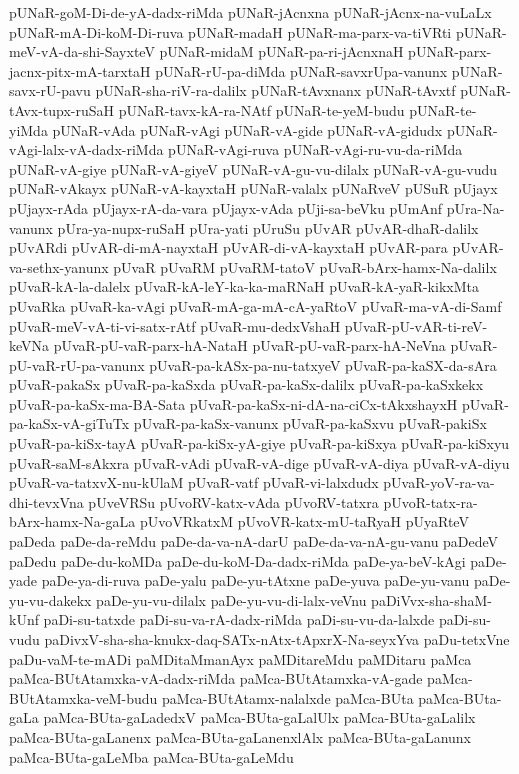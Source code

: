 {pUNaR-goM-Di-de-yA-dadx-riMda
pUNaR-jAcnxna
pUNaR-jAcnx-na-vuLaLx
pUNaR-mA-Di-koM-Di-ruva
pUNaR-madaH
pUNaR-ma-parx-va-tiVRti
pUNaR-meV-vA-da-shi-SayxteV
pUNaR-midaM
pUNaR-pa-ri-jAcnxnaH
pUNaR-parx-jacnx-pitx-mA-tarxtaH
pUNaR-rU-pa-diMda
pUNaR-savxrUpa-vanunx
pUNaR-savx-rU-pavu
pUNaR-sha-riV-ra-dalilx
pUNaR-tAvxnanx
pUNaR-tAvxtf
pUNaR-tAvx-tupx-ruSaH
pUNaR-tavx-kA-ra-NAtf
pUNaR-te-yeM-budu
pUNaR-te-yiMda
pUNaR-vAda
pUNaR-vAgi
pUNaR-vA-gide
pUNaR-vA-gidudx
pUNaR-vAgi-lalx-vA-dadx-riMda
pUNaR-vAgi-ruva
pUNaR-vAgi-ru-vu-da-riMda
pUNaR-vA-giye
pUNaR-vA-giyeV
pUNaR-vA-gu-vu-dilalx
pUNaR-vA-gu-vudu
pUNaR-vAkayx
pUNaR-vA-kayxtaH
pUNaR-valalx
pUNaRveV
pUSuR
pUjayx
pUjayx-rAda
pUjayx-rA-da-vara
pUjayx-vAda
pUji-sa-beVku
pUmAnf
pUra-Na-vanunx
pUra-ya-nupx-ruSaH
pUra-yati
pUruSu
pUvAR
pUvAR-dhaR-dalilx
pUvARdi
pUvAR-di-mA-nayxtaH
pUvAR-di-vA-kayxtaH
pUvAR-para
pUvAR-va-sethx-yanunx
pUvaR
pUvaRM
pUvaRM-tatoV
pUvaR-bArx-hamx-Na-dalilx
pUvaR-kA-la-dalelx
pUvaR-kA-leY-ka-ka-maRNaH
pUvaR-kA-yaR-kikxMta
pUvaRka
pUvaR-ka-vAgi
pUvaR-mA-ga-mA-cA-yaRtoV
pUvaR-ma-vA-di-Samf
pUvaR-meV-vA-ti-vi-satx-rAtf
pUvaR-mu-dedxVshaH
pUvaR-pU-vAR-ti-reV-keVNa
pUvaR-pU-vaR-parx-hA-NataH
pUvaR-pU-vaR-parx-hA-NeVna
pUvaR-pU-vaR-rU-pa-vanunx
pUvaR-pa-kASx-pa-nu-tatxyeV
pUvaR-pa-kaSX-da-sAra
pUvaR-pakaSx
pUvaR-pa-kaSxda
pUvaR-pa-kaSx-dalilx
pUvaR-pa-kaSxkekx
pUvaR-pa-kaSx-ma-BA-Sata
pUvaR-pa-kaSx-ni-dA-na-ciCx-tAkxshayxH
pUvaR-pa-kaSx-vA-giTuTx
pUvaR-pa-kaSx-vanunx
pUvaR-pa-kaSxvu
pUvaR-pakiSx
pUvaR-pa-kiSx-tayA
pUvaR-pa-kiSx-yA-giye
pUvaR-pa-kiSxya
pUvaR-pa-kiSxyu
pUvaR-saM-sAkxra
pUvaR-vAdi
pUvaR-vA-dige
pUvaR-vA-diya
pUvaR-vA-diyu
pUvaR-va-tatxvX-nu-kUlaM
pUvaR-vatf
pUvaR-vi-lalxdudx
pUvaR-yoV-ra-va-dhi-tevxVna
pUveVRSu
pUvoRV-katx-vAda
pUvoRV-tatxra
pUvoR-tatx-ra-bArx-hamx-Na-gaLa
pUvoVRkatxM
pUvoVR-katx-mU-taRyaH
pUyaRteV
paDeda
paDe-da-reMdu
paDe-da-va-nA-darU
paDe-da-va-nA-gu-vanu
paDedeV
paDedu
paDe-du-koMDa
paDe-du-koM-Da-dadx-riMda
paDe-ya-beV-kAgi
paDe-yade
paDe-ya-di-ruva
paDe-yalu
paDe-yu-tAtxne
paDe-yuva
paDe-yu-vanu
paDe-yu-vu-dakekx
paDe-yu-vu-dilalx
paDe-yu-vu-di-lalx-veVnu
paDiVvx-sha-shaM-kUnf
paDi-su-tatxde
paDi-su-va-rA-dadx-riMda
paDi-su-vu-da-lalxde
paDi-su-vudu
paDivxV-sha-sha-knukx-daq-SATx-nAtx-tApxrX-Na-seyxYva
paDu-tetxVne
paDu-vaM-te-mADi
paMDitaMmanAyx
paMDitareMdu
paMDitaru
paMca
paMca-BUtAtamxka-vA-dadx-riMda
paMca-BUtAtamxka-vA-gade
paMca-BUtAtamxka-veM-budu
paMca-BUtAtamx-nalalxde
paMca-BUta
paMca-BUta-gaLa
paMca-BUta-gaLadedxV
paMca-BUta-gaLalUlx
paMca-BUta-gaLalilx
paMca-BUta-gaLanenx
paMca-BUta-gaLanenxlAlx
paMca-BUta-gaLanunx
paMca-BUta-gaLeMba
paMca-BUta-gaLeMdu
}
